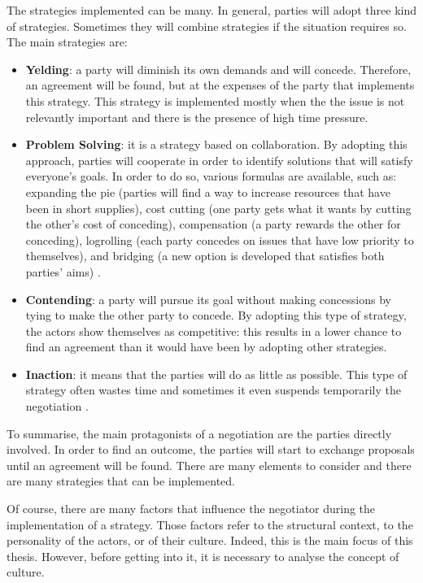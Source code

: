 \documentclass[../main.tex]{subfiles}
\begin{document}
The strategies implemented can be many. In general, parties will adopt three kind of strategies. Sometimes they will combine strategies if the situation requires so. The main strategies are:
\begin{itemize}
\item \textbf{Yelding}: a party will diminish its own demands and will concede. Therefore, an agreement will be found, but at the expenses of the party that implements this strategy. This strategy is implemented mostly when the the issue is not relevantly important and there is the presence of high time pressure.
\item \textbf{Problem Solving}: it is a strategy based on collaboration. By adopting this approach, parties will cooperate in order to identify solutions that will satisfy everyone's goals. In order to do so, various formulas are available, such as: expanding the pie (parties will find a way to increase resources that have been in short supplies), cost cutting (one party gets what it wants by cutting the other's cost of conceding), compensation (a party rewards the other for conceding), logrolling (each party concedes on issues that have low priority to themselves), and bridging (a new option is developed that satisfies both parties' aims) \autocite[168]{pruitt}.
\item \textbf{Contending}: a party will pursue its goal without making concessions by tying to make the other party to concede. By adopting this type of strategy, the actors show themselves as competitive: this results in a lower chance to find an agreement than it would have been by adopting other strategies.
\item \textbf{Inaction}: it means that the parties will do as little as possible. This type of strategy often wastes time and sometimes it even suspends temporarily the negotiation \mancite\autocite[172]{pruitt}.
\end{itemize}

To summarise, the main protagonists of a negotiation are the parties directly involved. In order to find an outcome, the parties will start to exchange proposals until an agreement will be found. There are many elements to consider and there are many strategies that can be implemented.

Of course, there are many factors that influence the negotiator during the implementation of a strategy. Those factors refer to the structural context, to the personality of the actors, or of their culture. Indeed, this is the main focus of this thesis. However, before getting into it, it is necessary to analyse the concept of culture.
\pagebreak
\end{document}
